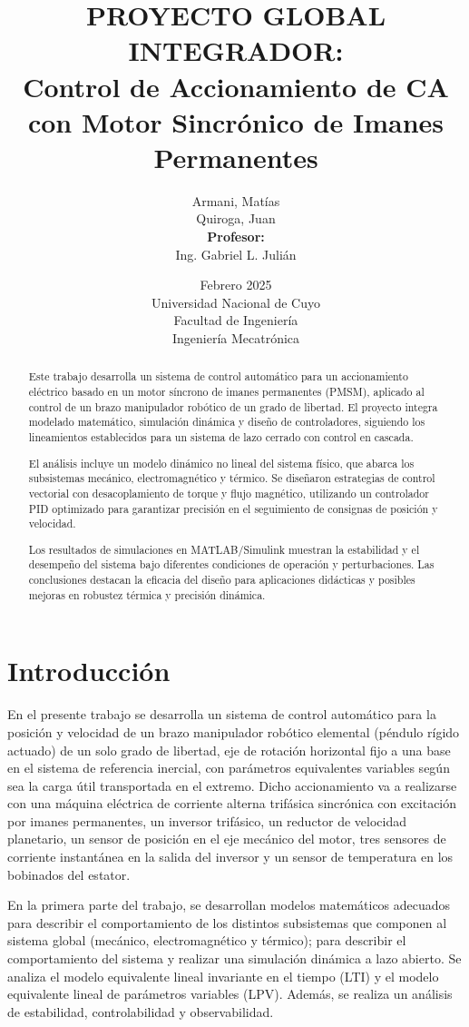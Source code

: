 \documentclass{article}
\title{\textbf{PROYECTO GLOBAL\\INTEGRADOR:\\Control de Accionamiento de CA\\ con Motor Sincrónico de Imanes Permanentes}}
\author{
Armani, Matías\\
    \vspace{1cm}
Quiroga, Juan\\
    \textbf{Profesor:} \\
    Ing. Gabriel L. Julián
}
\date{Febrero 2025 \\ Universidad Nacional de Cuyo \\ Facultad de Ingeniería \\ Ingeniería Mecatrónica}
\begin{document}
\maketitle
\begin{abstract}
Este trabajo desarrolla un sistema de control automático para un accionamiento eléctrico basado en un motor síncrono de imanes permanentes (PMSM), aplicado al control de un brazo manipulador robótico de un grado de libertad. El proyecto integra modelado matemático, simulación dinámica y diseño de controladores, siguiendo los lineamientos establecidos para un sistema de lazo cerrado con control en cascada.

El análisis incluye un modelo dinámico no lineal del sistema físico, que abarca los subsistemas mecánico, electromagnético y térmico. Se diseñaron estrategias de control vectorial con desacoplamiento de torque y flujo magnético, utilizando un controlador PID optimizado para garantizar precisión en el seguimiento de consignas de posición y velocidad.

Los resultados de simulaciones en MATLAB/Simulink muestran la estabilidad y el desempeño del sistema bajo diferentes condiciones de operación y perturbaciones. Las conclusiones destacan la eficacia del diseño para aplicaciones didácticas y posibles mejoras en robustez térmica y precisión dinámica.
\end{abstract}



\newpage
\tableofcontents



\newpage
\section{Introducción}
En el presente trabajo se desarrolla un sistema de control automático para la posición y velocidad de un brazo manipulador robótico elemental (péndulo rígido actuado) de un solo grado de libertad, eje de rotación horizontal fijo a una base en el sistema de referencia inercial, con parámetros equivalentes variables según sea la carga útil transportada en el extremo. Dicho accionamiento va a realizarse con una máquina eléctrica de corriente alterna trifásica sincrónica con excitación por imanes permanentes, un inversor trifásico, un reductor de velocidad planetario, un sensor de posición en el eje mecánico del motor, tres sensores de corriente instantánea en la salida del inversor y un sensor de temperatura en los bobinados del estator.

En la primera parte del trabajo, se desarrollan modelos matemáticos adecuados para describir el comportamiento de los distintos subsistemas que componen al sistema global (mecánico, electromagnético y térmico); para describir el comportamiento del sistema y realizar una simulación dinámica a lazo abierto. Se analiza el modelo equivalente lineal invariante en el tiempo (LTI) y el modelo equivalente lineal de parámetros variables (LPV). Además, se realiza un análisis de estabilidad, controlabilidad y observabilidad.
\end{document}
